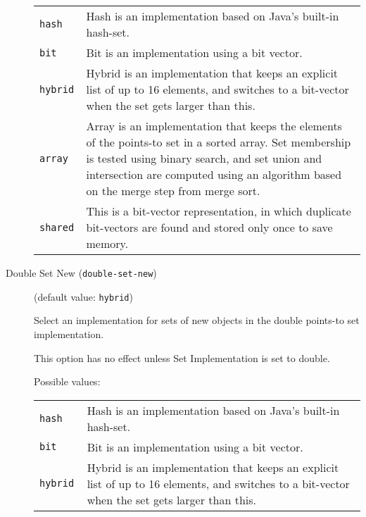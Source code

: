 \documentclass{article}
\begin{document}
\begin{description}
\begin{longtable}{p{1in}p{4in}}
{\tt hash }
&

Hash is an implementation based on Java's built-in hash-set.
\\

{\tt bit }
&

Bit is an implementation using a bit vector.
\\

{\tt hybrid }
&

Hybrid is an implementation that keeps an explicit list of up to
16 elements, and switches to a bit-vector when the set gets
larger than this.
\\

{\tt array }
&

Array is an implementation that keeps the elements of the
points-to set in a sorted array. Set membership is tested using
binary search, and set union and intersection are computed using
an algorithm based on the merge step from merge sort.
\\

{\tt shared }
&
This is a bit-vector representation, in which duplicate bit-vectors are found and stored only once to save memory.\\

\end{longtable}


\item[Double Set New ({\tt double-set-new})]
(default value: {\tt hybrid})




Select an implementation for sets of new objects in the double
points-to set implementation.

This option has no effect unless Set Implementation is set to double.
        



Possible values:\\
\begin{longtable}{p{1in}p{4in}}

{\tt hash }
&

Hash is an implementation based on Java's built-in hash-set.
\\

{\tt bit }
&

Bit is an implementation using a bit vector.
\\

{\tt hybrid }
&

Hybrid is an implementation that keeps an explicit list of up to
16 elements, and switches to a bit-vector when the set gets
larger than this.
\\


\end{longtable}
\end{description}
\end{document}
